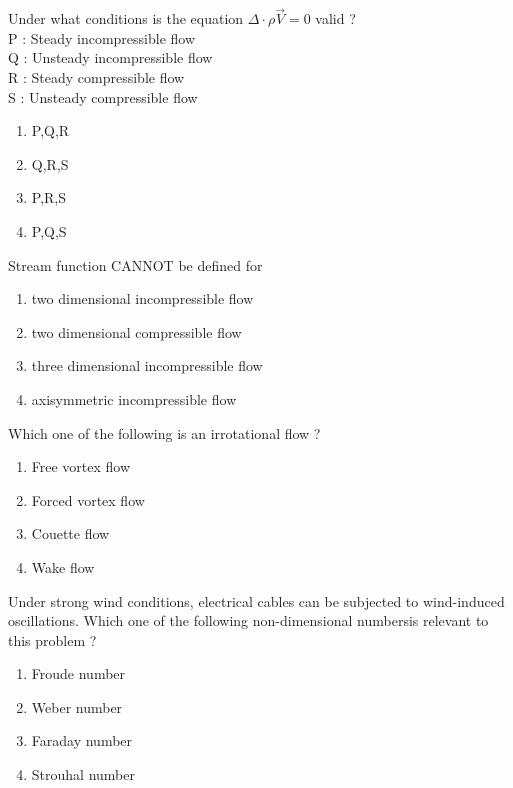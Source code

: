 \iffalse
\chapter{2009}
\author{AI24BTECH11009}
\section{xe}
\fi

\item Under what conditions is the equation $\Delta \cdot \rho \overrightarrow{V} = 0$ valid ?\\
P : Steady incompressible flow \\
Q : Unsteady incompressible flow \\
R : Steady compressible flow \\
S : Unsteady compressible flow 
    \begin{enumerate}
        \item P,Q,R
        \item Q,R,S
        \item P,R,S
        \item P,Q,S \\
    \end{enumerate}
\item Stream function CANNOT be defined for
\begin{enumerate}
    \item two dimensional incompressible flow
    \item two dimensional compressible flow
    \item three dimensional incompressible flow
    \item axisymmetric incompressible flow \\
\end{enumerate}
\item Which one of the following is an irrotational flow ?
\begin{enumerate}
    \item Free vortex flow
    \item Forced vortex flow
    \item Couette flow
    \item Wake flow \\
\end{enumerate}
\item Under strong wind conditions, electrical cables can be subjected to wind-induced oscillations. Which one of the following non-dimensional numbersis relevant to this problem ?
 \begin{enumerate}
     \item Froude number
     \item Weber number
     \item Faraday number
     \item Strouhal number \\
 \end{enumerate}
